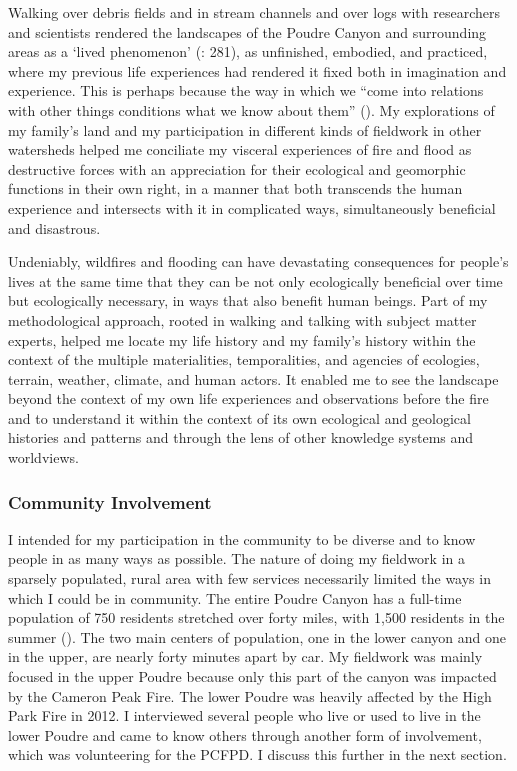 \documentclass[
]{article}
\begin{document}
Walking over debris fields and in stream channels and over logs with researchers and scientists rendered the landscapes of the Poudre Canyon and surrounding areas as a `lived phenomenon' (: 281), as unfinished, embodied, and practiced, where my previous life experiences had rendered it fixed both in imagination and experience. This is perhaps because the way in which we ``come into relations with other things conditions what we know about them'' (). My explorations of my family's land and my participation in different kinds of fieldwork in other watersheds helped me conciliate my visceral experiences of fire and flood as destructive forces with an appreciation for their ecological and geomorphic functions in their own right, in a manner that both transcends the human experience and intersects with it in complicated ways, simultaneously beneficial and disastrous.

Undeniably, wildfires and flooding can have devastating consequences for people's lives at the same time that they can be not only ecologically beneficial over time but ecologically necessary, in ways that also benefit human beings. Part of my methodological approach, rooted in walking and talking with subject matter experts, helped me locate my life history and my family's history within the context of the multiple materialities, temporalities, and agencies of ecologies, terrain, weather, climate, and human actors. It enabled me to see the landscape beyond the context of my own life experiences and observations before the fire and to understand it within the context of its own ecological and geological histories and patterns and through the lens of other knowledge systems and worldviews.

\subsubsection{Community Involvement}\label{community-involvement}

I intended for my participation in the community to be diverse and to know people in as many ways as possible. The nature of doing my fieldwork in a sparsely populated, rural area with few services necessarily limited the ways in which I could be in community. The entire Poudre Canyon has a full-time population of 750 residents stretched over forty miles, with 1,500 residents in the summer (). The two main centers of population, one in the lower canyon and one in the upper, are nearly forty minutes apart by car. My fieldwork was mainly focused in the upper Poudre because only this part of the canyon was impacted by the Cameron Peak Fire. The lower Poudre was heavily affected by the High Park Fire in 2012. I interviewed several people who live or used to live in the lower Poudre and came to know others through another form of involvement, which was volunteering for the PCFPD. I discuss this further in the next section.
\end{document}
